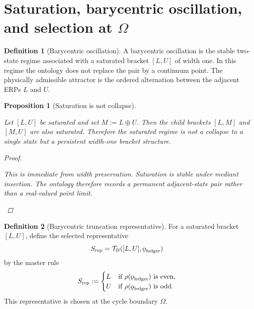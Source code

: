 \documentclass[11pt, letterpaper]{article}
\newcommand{\med}{\oplus}
\newcommand{\rank}{\rho}
\newcommand{\koppa}{\mathbin{\text{\rm\k{o}}}}
\theoremstyle{definition}
\newtheorem{definition}{Definition}[section]
\theoremstyle{plain}
\newtheorem{proposition}{Proposition}[section]
\begin{document}
\section{Saturation, barycentric oscillation, and selection at $\Omega$}

\begin{definition}[Barycentric oscillation]
A barycentric oscillation is the stable two-state regime associated with a
saturated bracket $[L,U]$ of width one.  In this regime the ontology does not
replace the pair by a continuum point.  The physically admissible attractor is
the ordered alternation between the adjacent ERPs $L$ and $U$.
\end{definition}

\begin{proposition}[Saturation is not collapse]
\begin{rsbox}
Let $[L,U]$ be saturated and set $M:=L\med U$.  Then the child brackets
$[L,M]$ and $[M,U]$ are also saturated.  Therefore the saturated regime is not
a collapse to a single state but a persistent width-one bracket structure.
\end{rsbox}
\begin{proof}
\begin{rsbox}
This is immediate from width preservation.  Saturation is stable under mediant
insertion.  The ontology therefore records a permanent adjacent-state pair
rather than a real-valued point limit.
\end{rsbox}
\end{proof}

\end{proposition}

\begin{definition}[Barycentric truncation representative]
For a saturated bracket $[L,U]$, define the selected representative
\[
S_{\mathrm{rep}}=\mathcal{T}_B([L,U],\koppa_{\mathrm{ledger}})
\]
by the master rule
\[
S_{\mathrm{rep}}:=
\begin{cases}
L & \text{if }\rank(\koppa_{\mathrm{ledger}})\text{ is even},\\
U & \text{if }\rank(\koppa_{\mathrm{ledger}})\text{ is odd}.
\end{cases}
\]
This representative is chosen at the cycle boundary $\Omega$.
\end{definition}
\end{document}
